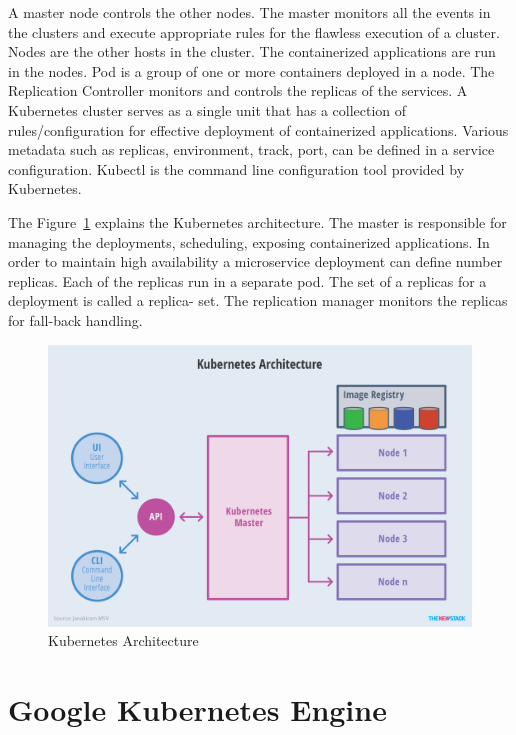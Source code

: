 A master node controls the other nodes. The master monitors all the events in
the clusters and execute appropriate  rules for the flawless execution of a
cluster.  Nodes are the other hosts in the cluster. The containerized
applications are run in the nodes. Pod is a group of one or more containers
deployed in a node. The Replication Controller monitors and controls the
replicas of the services. A Kubernetes cluster serves as a single unit that
has a collection of rules/configuration for effective deployment of
containerized applications. Various metadata such as replicas, environment,
track, port, can be defined in a service configuration.  Kubectl is the
command line configuration tool provided by Kubernetes.

The Figure~\ref{fig:kube-archtecture} explains the Kubernetes architecture.
The master is responsible for managing the deployments, scheduling, exposing
containerized applications. In order to maintain high availability a
microservice deployment can define number replicas. Each of the replicas run
in a separate pod. The set of a replicas for a deployment is called a replica-
set. The replication manager monitors the replicas for fall-back handling.

\begin{figure}[htb]
	\centering\includegraphics[width=\columnwidth]{images/hid_417_Kubernetes-Architecture.png}
  \caption{Kubernetes Architecture~\cite{hid-sp18-417-kubernetes}}
  \label{fig:kube-archtecture}
\end{figure}


\section{ Google Kubernetes Engine}

